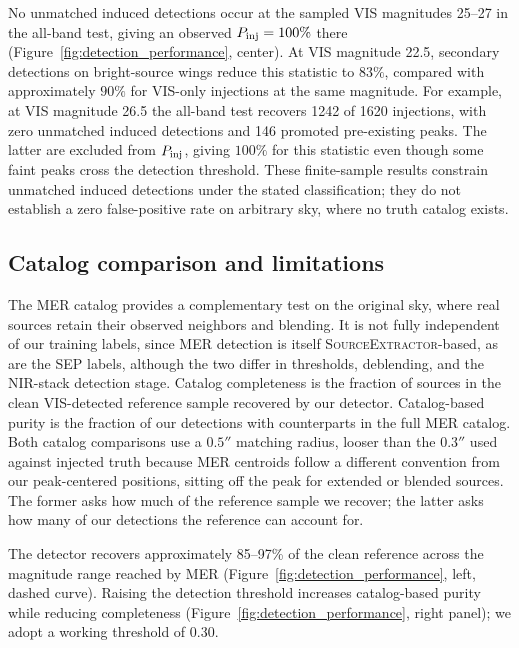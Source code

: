 \documentclass[twocolumn,linenumbers]{aastex701}
\begin{document}
No unmatched induced detections occur at the sampled VIS magnitudes 25--27 in the all-band test, giving an observed $P_{\rm inj}=100\%$ there (Figure~\ref{fig:detection_performance}, center). At VIS magnitude 22.5, secondary detections on bright-source wings reduce this statistic to $83\%$, compared with approximately $90\%$ for VIS-only injections at the same magnitude. For example, at VIS magnitude 26.5 the all-band test recovers 1242 of 1620 injections, with zero unmatched induced detections and 146 promoted pre-existing peaks. The latter are excluded from $P_{\rm inj}$, giving $100\%$ for this statistic even though some faint peaks cross the detection threshold. These finite-sample results constrain unmatched induced detections under the stated classification; they do not establish a zero false-positive rate on arbitrary sky, where no truth catalog exists.

\subsection{Catalog comparison and limitations}

The MER catalog provides a complementary test on the original sky, where real sources retain their observed neighbors and blending. It is not fully independent of our training labels, since MER detection is itself \textsc{SourceExtractor}-based, as are the \textsc{SEP} labels, although the two differ in thresholds, deblending, and the NIR-stack detection stage. Catalog completeness is the fraction of sources in the clean VIS-detected reference sample recovered by our detector. Catalog-based purity is the fraction of our detections with counterparts in the full MER catalog. Both catalog comparisons use a $0.5''$ matching radius, looser than the $0.3''$ used against injected truth because MER centroids follow a different convention from our peak-centered positions, sitting off the peak for extended or blended sources. The former asks how much of the reference sample we recover; the latter asks how many of our detections the reference can account for.

The detector recovers approximately 85--97\% of the clean reference across the magnitude range reached by MER (Figure~\ref{fig:detection_performance}, left, dashed curve). Raising the detection threshold increases catalog-based purity while reducing completeness (Figure~\ref{fig:detection_performance}, right panel); we adopt a working threshold of 0.30.
\end{document}
